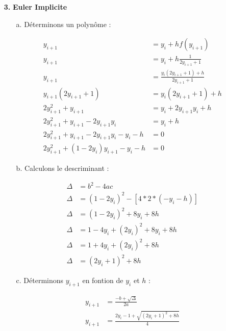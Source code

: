 \documentclass[12pt, letterpaper]{article}
\begin{document}
\begin{enumerate}
\item[\textbf{3.}] \textbf{Euler Implicite}

\begin{enumerate}
\item[a.] Déterminons un polynôme :

  \begin{equation*}
    \begin{split}
      y_{i+1} & = y_i + h f(y_{i+1}) \\
      y_{i+1} & = y_i + h \frac{1}{2y_{i+1} + 1} \\
      y_{i+1} & = \frac{y_i (2y_{i+1} + 1) + h}{2y_{i+1} + 1} \\
      y_{i+1} (2y_{i+1} + 1) & = y_i (2y_{i+1} + 1) + h \\
      2y_{i+1}^2 + y_{i+1} & = y_i + 2y_{i+1}y_i + h \\
      2y_{i+1}^2 + y_{i+1} - 2y_{i+1}y_i & = y_i + h \\
      2y_{i+1}^2 + y_{i+1} - 2y_{i+1}y_i - y_i - h & = 0 \\
      2y_{i+1}^2 + (1 - 2y_i) y_{i+1} - y_i - h & = 0
    \end{split}
  \end{equation*}

\item[b.] Calculons le descriminant :

    \begin{equation*}
    \begin{split}
      \Delta & = b^2 - 4ac \\
      \Delta & = (1 - 2y_i)^2 - [4 * 2 * (- y_i - h)] \\
      \Delta & = (1 - 2y_i)^2 + 8y_i + 8h \\
      \Delta & = 1 - 4y_i + (2y_i)^2 + 8y_i + 8h \\
      \Delta & = 1 + 4y_i + (2y_i)^2 + 8h \\
      \Delta & = (2y_i + 1)^2 + 8h
    \end{split}
  \end{equation*}

\item[c.] Déterminons $y_{i+1}$ en fontion de $y_i$ et $h$ :

  \begin{equation*}
    \begin{split}
      y_{i+1} & = \frac{- b + \sqrt{\Delta}}{2a} \\
      y_{i+1} & = \frac{2y_i - 1 + \sqrt{(2y_i + 1)^2 + 8h}}{4} 
    \end{split}
  \end{equation*}


\end{enumerate}
\end{enumerate}
\end{document}
